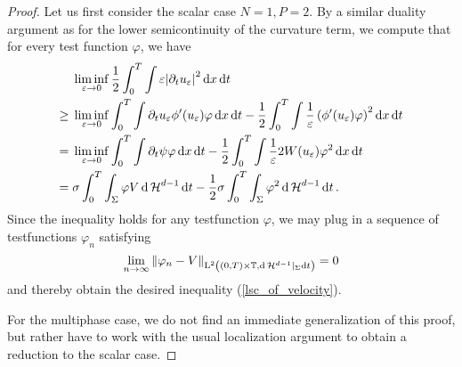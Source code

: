 \begin{proof}
	Let us first consider the 
	scalar case $ N = 1 , P = 2 $. By a similar duality argument as for the 
	lower semicontinuity of the curvature term, we compute 
	that for 
	every test function $ \varphi $, we have
	\begin{align*}
		& \liminf_{ \varepsilon \to 0 }
			\frac{ 1 }{ 2 }
			\int_{ 0 }^{ T }
				\int
					\varepsilon \abs{ \partial_{ t } u_{ \varepsilon } }^{ 2 }
				\dd{ x }
			\dd{ t }
		\\
		\geq{} &
		\liminf_{ \varepsilon \to 0 }
			\int_{ 0 }^{ T }
				\int
					\partial_{ t } u_{ \varepsilon } 
					\phi ' ( u_{ \varepsilon } )
					\varphi
				\dd{ x }
			\dd{ t }
		-
		\frac{ 1 }{ 2 }
		\int_{ 0 }^{ T }
			\int
				\frac{ 1 }{ \varepsilon }
				\left( \phi ' ( u_{ \varepsilon } ) \varphi \right)^{ 2 }
			\dd{ x }
		\dd{ t }
		\\
		={} &
		\liminf_{ \varepsilon \to 0 }
			\int_{ 0 }^{ T }
				\int
					\partial_{ t } \psi
					\varphi
				\dd{ x }
			\dd{ t }
			-
			\frac{ 1 }{ 2 }
			\int_{ 0 }^{ T }
				\int
					\frac{ 1 }{ \varepsilon }
					2 W ( u_{ \varepsilon } )
					\varphi^{ 2 }
				\dd{ x }
			\dd{ t }
		\\
		={} &
		\sigma
		\int_{ 0 }^{ T }
			\int_{ \Sigma }
				\varphi V
			\dd{ \operatorname{\mathcal{H}}^{ d - 1 } }
		\dd{ t }
		-
		\frac{ 1 }{ 2 }
		\sigma
		\int_{ 0 }^{ T }
			\int_{ \Sigma }
				\varphi^{ 2 }
			\dd{ \operatorname{\mathcal{H}}^{ d - 1 } }
		\dd{ t }.
	\end{align*}	
	Since the inequality holds for any testfunction $ \varphi $, we may 
	plug in a sequence of testfunctions $ \varphi_{ n } $ satisfying
	\begin{equation*}
		\lim_{ n \to \infty }
			\norm{ \varphi_{ n } - V }_{ \operatorname{L}^{ 2 } \left( ( 0 , T ) \times 
			\operatorname{\mathbb{T}} , \dd{ \operatorname{\mathcal{H}}^{ d - 1 } } |_{ \Sigma } \dd{ t } \right) }
		= 0
	\end{equation*}
	and thereby obtain the desired inequality (\ref{lsc_of_velocity}).
	
	For the multiphase case, we do not find an immediate generalization of this 
	proof, but rather have to work with the usual localization argument to 
	obtain a reduction to the scalar case.
	

\end{proof}
